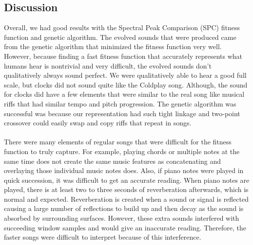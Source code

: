 \documentclass{pnastwo}
\begin{document}
\begin{article}
\subsection{Discussion}
Overall, we had good results with the Spectral Peak Comparison (SPC) fitness function and genetic algorithm. The evolved sounds that were produced came from the genetic algorithm that minimized the fitness function very well. However, because finding a fast fitness function that accurately represents what humans hear is nontrivial and very difficult, the evolved sounds don't qualitatively always sound perfect. We were qualitatively able to hear a good full scale, but clocks did not sound quite like the Coldplay song. Although, the sound for clocks did have a few elements that were similar to the real song like musical riffs that had similar tempo and pitch progression. The genetic algorithm was successful was because our representation had such tight linkage and two-point crossover could easily swap and copy riffs that repeat in songs.\\
\\
There were many elements of regular songs that were difficult for the fitness function to truly capture. For example, playing chords or multiple notes at the same time does not create the same music features as concatenating and overlaying those individual music notes does. Also, if piano notes were played in quick succession, it was difficult to get an accurate reading. When piano notes are played, there is at least two to three seconds of reverberation afterwards, which is normal and expected. Reverberation is created when a sound or signal is reflected causing a large number of reflections to build up and then decay as the sound is absorbed by surrounding surfaces. However, these extra sounds interfered with succeeding window samples and would give an inaccurate reading. Therefore, the faster songs were difficult to interpret because of this interference.

\end{article}
\end{document}
